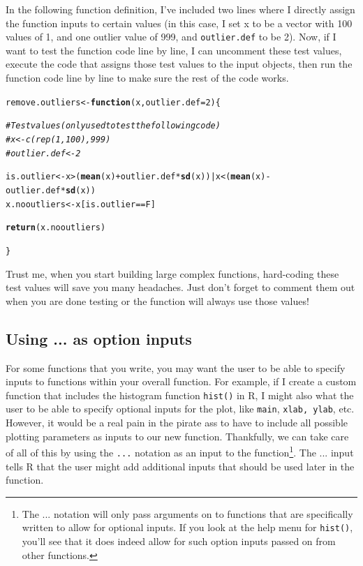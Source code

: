 \documentclass{tufte-book}\usepackage[]{graphicx}\usepackage[]{color}
\makeatletter
\newcommand{\hlnum}[1]{\textcolor[rgb]{0.686,0.059,0.569}{#1}}%
\newcommand{\hlcom}[1]{\textcolor[rgb]{0.678,0.584,0.686}{\textit{#1}}}%
\newcommand{\hlopt}[1]{\textcolor[rgb]{0,0,0}{#1}}%
\newcommand{\hlstd}[1]{\textcolor[rgb]{0.345,0.345,0.345}{#1}}%
\newcommand{\hlkwa}[1]{\textcolor[rgb]{0.161,0.373,0.58}{\textbf{#1}}}%
\newcommand{\hlkwb}[1]{\textcolor[rgb]{0.69,0.353,0.396}{#1}}%
\newcommand{\hlkwc}[1]{\textcolor[rgb]{0.333,0.667,0.333}{#1}}%
\newcommand{\hlkwd}[1]{\textcolor[rgb]{0.737,0.353,0.396}{\textbf{#1}}}%
\newenvironment{kframe}{%
 \def\at@end@of@kframe{}%
 \ifinner\ifhmode%
  \def\at@end@of@kframe{\end{minipage}}%
  \begin{minipage}{\columnwidth}%
 \fi\fi%
 \def\FrameCommand##1{\hskip\@totalleftmargin \hskip-\fboxsep
 \colorbox{shadecolor}{##1}\hskip-\fboxsep
     \hskip-\linewidth \hskip-\@totalleftmargin \hskip\columnwidth}%
 \MakeFramed {\advance\hsize-\width
   \@totalleftmargin\z@ \linewidth\hsize
   \@setminipage}}%
 {\par\unskip\endMakeFramed%
 \at@end@of@kframe}
\newenvironment{knitrout}{}{} %
\makeatother
\begin{document}
\begin{footnotesize}
In the following function definition, I've included two lines where I directly assign the function inputs to certain values (in this case, I set x to be a vector with 100 values of 1, and one outlier value of 999, and \texttt{outlier.def} to be 2). Now, if I want to test the function code line by line, I can uncomment these test values, execute the code that assigns those test values to the input objects, then run the function code line by line to make sure the rest of the code works.

\begin{knitrout}
\color{fgcolor}\begin{kframe}
\begin{alltt}
\hlstd{remove.outliers} \hlkwb{<-} \hlkwa{function}\hlstd{(}\hlkwc{x}\hlstd{,} \hlkwc{outlier.def} \hlstd{=} \hlnum{2}\hlstd{) \{}

\hlcom{# Test values (only used to test the following code)}
\hlcom{#  x <- c(rep(1, 100), 999)}
\hlcom{#  outlier.def <- 2}

  \hlstd{is.outlier} \hlkwb{<-} \hlstd{x} \hlopt{>} \hlstd{(}\hlkwd{mean}\hlstd{(x)} \hlopt{+} \hlstd{outlier.def} \hlopt{*} \hlkwd{sd}\hlstd{(x))} \hlopt{|} \hlstd{x} \hlopt{<} \hlstd{(}\hlkwd{mean}\hlstd{(x)} \hlopt{-} \hlstd{outlier.def} \hlopt{*} \hlkwd{sd}\hlstd{(x))}
  \hlstd{x.nooutliers} \hlkwb{<-} \hlstd{x[is.outlier} \hlopt{==} \hlstd{F]}

  \hlkwd{return}\hlstd{(x.nooutliers)}

\hlstd{\}}
\end{alltt}
\end{kframe}
\end{knitrout}

Trust me, when you start building large complex functions, hard-coding these test values will save you many headaches. Just don't forget to comment them out when you are done testing or the function will always use those values!


\subsection{Using ... as option inputs}

For some functions that you write, you may want the user to be able to specify inputs to functions within your overall function. For example, if I create a custom function that includes the histogram function \texttt{hist()} in R, I might also what the user to be able to specify optional inputs for the plot, like \texttt{main}, \texttt{xlab, ylab}, etc. However, it would be a real pain in the pirate ass to have to include all possible plotting parameters as inputs to our new function. Thankfully, we can take care of all of this by using the \texttt{...} notation as an input to the function\footnote{The ... notation will only pass arguments on to functions that are specifically written to allow for optional inputs. If you look at the help menu for \texttt{hist()}, you'll see that it does indeed allow for such option inputs passed on from other functions.}. The ... input tells R that the user might add additional inputs that should be used later in the function.




\end{footnotesize}
\end{document}
